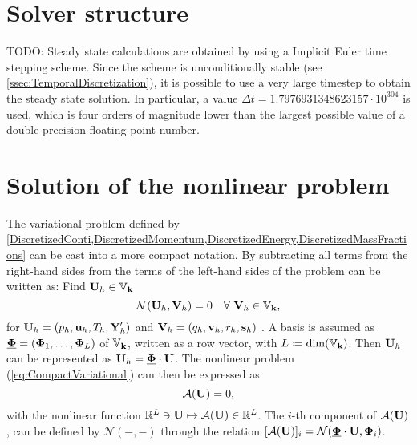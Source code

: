\section{Solver structure}

TODO: Steady state calculations are obtained by using a Implicit Euler time stepping scheme. Since the scheme is unconditionally stable (see \cref{ssec:TemporalDiscretization}), it is possible to use a very large timestep to obtain the steady state solution. In particular, a value $\Delta t = 1.7976931348623157\cdot 10^{304}$ is used, which is four orders of magnitude lower than the largest possible value of a double-precision floating-point number.
\section{Solution of the nonlinear problem}\label{sec:SolNonLinProblem}



The variational problem defined by \cref*{DiscretizedConti,DiscretizedMomentum,DiscretizedEnergy,DiscretizedMassFractions} can be cast into a more compact notation. By subtracting all terms from the right-hand sides from the terms of the left-hand sides of  the problem can be written as:
Find $\textbf{U}_h \in \mathbb{V}_{\textbf{k}}$
\begin{equation}
	\mathcal{N}(\textbf{U}_h,\textbf{V}_h) = 0 \quad \forall \ \textbf{V}_h \in \mathbb{V}_{\textbf{k}} ,
	\label{eq:CompactVariational}
\end{equation}
for
$\textbf{U}_h = (p_h,\textbf{u}_h, T_h, \textbf{Y}'_h)$ and
$\textbf{V}_h = (q_h,\textbf{v}_h, r_h, \mathbf{s}_h)$
. A basis is assumed as
$\underline{\boldsymbol{\Phi}} = ( \boldsymbol{\Phi}_1, \ldots , \boldsymbol{\Phi}_L )$ of $\mathbb{V}_{\textbf{k}}$,
written as a row vector, with $L \coloneqq \textrm{dim}(\mathbb{V}_{\textbf{k}})$.
Then $\textbf{U}_h$ can be represented as
$ \textbf{U}_h =  \underline{ \boldsymbol{\Phi} } \cdot \textbf{U} $.
The nonlinear problem (\ref{eq:CompactVariational}) can then be expressed as
\begin{equation}
	\mathcal{A}(\textbf{U}) = 0 ,
	\label{Eq:nonLinSystem}
\end{equation}
with the nonlinear function
$\mathbb{R}^L \ni \textbf{U} \mapsto \mathcal{A}(\textbf{U}) \in \mathbb{R}^L$.
The $i$-th component of $ \mathcal{A}(\textbf{U})$, can be defined by $\mathcal{N}(-,-)$ through the relation
$[\mathcal{A}(\textbf{U})]_i = \mathcal{N}( \underline{ \boldsymbol{\Phi} } \cdot \textbf{U} , \boldsymbol{\Phi}_i)$.

